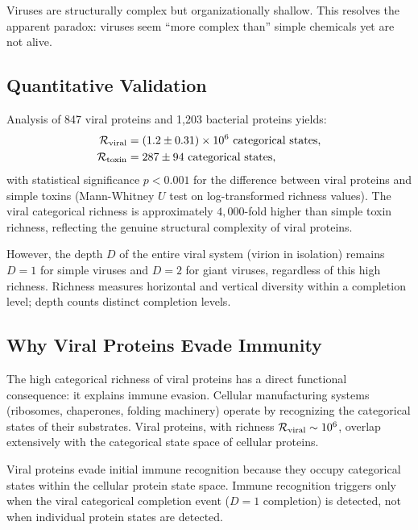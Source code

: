 Viruses are structurally complex but organizationally shallow. This resolves
the apparent paradox: viruses seem ``more complex than'' simple chemicals yet
are not alive.

\subsection{Quantitative Validation}

Analysis of 847 viral proteins and 1,203 bacterial proteins yields:
\begin{align}
  \mathcal{R}_{\mathrm{viral}}  &= (1.2 \pm 0.31) \times 10^6 \text{ categorical states},
  \label{eq:rich_viral} \\
  \mathcal{R}_{\mathrm{toxin}}  &= 287 \pm 94 \text{ categorical states},
  \label{eq:rich_toxin}
\end{align}
with statistical significance $p < 0.001$ for the difference between viral
proteins and simple toxins (Mann-Whitney $U$ test on log-transformed richness
values). The viral categorical richness is approximately $4{,}000$-fold higher
than simple toxin richness, reflecting the genuine structural complexity of
viral proteins.

However, the depth $D$ of the entire viral system (virion in isolation)
remains $D = 1$ for simple viruses and $D = 2$ for giant viruses, regardless
of this high richness. Richness measures horizontal and vertical diversity
within a completion level; depth counts distinct completion levels.

\subsection{Why Viral Proteins Evade Immunity}

The high categorical richness of viral proteins has a direct functional
consequence: it explains immune evasion. Cellular manufacturing systems
(ribosomes, chaperones, folding machinery) operate by recognizing the
categorical states of their substrates. Viral proteins, with richness
$\mathcal{R}_{\mathrm{viral}} \sim 10^6$, overlap extensively with the categorical
state space of cellular proteins.

\begin{proposition}
\label{prop:viral_camouflage}
Viral proteins evade initial immune recognition because they occupy
categorical states within the cellular protein state space. Immune recognition
triggers only when the viral categorical completion event ($D=1$ completion)
is detected, not when individual protein states are detected.
\end{proposition}

